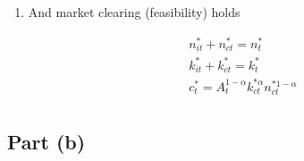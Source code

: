 \documentclass{scrartcl}
\begin{document}
\begin{itemize}
\begin{enumerate}
		\item And market clearing (feasibility) holds
		
		\begin{align}
		n^*_{it}+n^*_{ct}=n^*_{t} \label{eq:nclearing} \\
		k^*_{it}+k^*_{ct}=k^*_{t} \label{eq:kclearing} \\
		c^*_{t}=A_t^{1-\alpha}k^{* \alpha}_{ct} n_{ct}^{* 1-\alpha} \\
		\end{align}
		
	\end{enumerate}
	
\end{itemize}

\subsection*{Part (b)}
\end{document}
